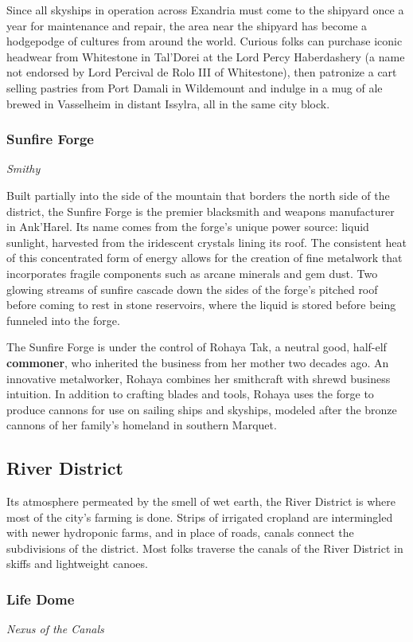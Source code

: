 \documentclass[10pt,a4paper,twoside,bg=print,twocolumn,openany,nodeprecatedcode]{dndbook}
\begin{document}
Since all skyships in operation across Exandria must come to the shipyard once a year for maintenance and repair, the area near the shipyard has become a hodgepodge of cultures from around the world. Curious folks can purchase iconic headwear from Whitestone in Tal'Dorei at the Lord Percy Haberdashery (a name not endorsed by Lord Percival de Rolo III of Whitestone), then patronize a cart selling pastries from Port Damali in Wildemount and indulge in a mug of ale brewed in Vasselheim in distant Issylra, all in the same city block.

\subsubsection{Sunfire Forge}
\textit{Smithy}

Built partially into the side of the mountain that borders the north side of the district, the Sunfire Forge is the premier blacksmith and weapons manufacturer in Ank'Harel. Its name comes from the forge's unique power source: liquid sunlight, harvested from the iridescent crystals lining its roof. The consistent heat of this concentrated form of energy allows for the creation of fine metalwork that incorporates fragile components such as arcane minerals and gem dust. Two glowing streams of sunfire cascade down the sides of the forge's pitched roof before coming to rest in stone reservoirs, where the liquid is stored before being funneled into the forge.

The Sunfire Forge is under the control of Rohaya Tak, a neutral good, half-elf \textbf{commoner}, who inherited the business from her mother two decades ago. An innovative metalworker, Rohaya combines her smithcraft with shrewd business intuition. In addition to crafting blades and tools, Rohaya uses the forge to produce cannons for use on sailing ships and skyships, modeled after the bronze cannons of her family's homeland in southern Marquet.

\subsection{River District}
Its atmosphere permeated by the smell of wet earth, the River District is where most of the city's farming is done. Strips of irrigated cropland are intermingled with newer hydroponic farms, and in place of roads, canals connect the subdivisions of the district. Most folks traverse the canals of the River District in skiffs and lightweight canoes.

\subsubsection{Life Dome}
\textit{Nexus of the Canals}
\end{document}
